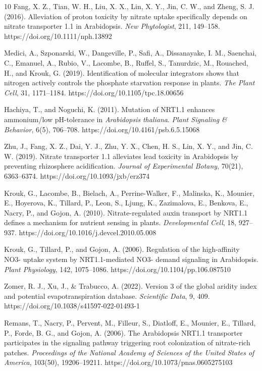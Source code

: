 \documentclass[unnumsec,webpdf,contemporary,large]{oup-authoring-template}%
\theoremstyle{thmstyleone}%
\theoremstyle{thmstyletwo}%
\theoremstyle{thmstylethree}%
\begin{document}
\begin{thebibliography}{10}
Fang, X. Z., Tian, W. H., Liu, X. X., Lin, X. Y., Jin, C. W., and Zheng, S. J. (2016).
Alleviation of proton toxicity by nitrate uptake specifically depends on nitrate transporter 1.1 in Arabidopsis.
\textit{New Phytologist}, 211, 149--158.
https://doi.org/10.1111/nph.13892

Medici, A., Szponarski, W., Dangeville, P., Safi, A., Dissanayake, I. M., Saenchai, C., Emanuel, A., Rubio, V., Lacombe, B., Ruffel, S., Tanurdzic, M., Rouached, H., and Krouk, G. (2019).
Identification of molecular integrators shows that nitrogen actively controls the phosphate starvation response in plants.
\textit{The Plant Cell}, 31, 1171--1184.
https://doi.org/10.1105/tpc.18.00656

Hachiya, T., and Noguchi, K. (2011).
Mutation of NRT1.1 enhances ammonium/low pH-tolerance in \textit{Arabidopsis thaliana}.
\textit{Plant Signaling \& Behavior}, 6(5), 706--708.
https://doi.org/10.4161/psb.6.5.15068

Zhu, J., Fang, X. Z., Dai, Y. J., Zhu, Y. X., Chen, H. S., Lin, X. Y., and Jin, C. W. (2019).
Nitrate transporter 1.1 alleviates lead toxicity in Arabidopsis by preventing rhizosphere acidification.
\textit{Journal of Experimental Botany}, 70(21), 6363--6374.
https://doi.org/10.1093/jxb/erz374

Krouk, G., Lacombe, B., Bielach, A., Perrine-Walker, F., Malinska, K., Mounier, E., Hoyerova, K., Tillard, P., Leon, S., Ljung, K., Zazimalova, E., Benkova, E., Nacry, P., and Gojon, A. (2010).
Nitrate-regulated auxin transport by NRT1.1 defines a mechanism for nutrient sensing in plants.
\textit{Developmental Cell}, 18, 927--937.
https://doi.org/10.1016/j.devcel.2010.05.008

Krouk, G., Tillard, P., and Gojon, A. (2006).
Regulation of the high-affinity NO3- uptake system by NRT1.1-mediated NO3- demand signaling in Arabidopsis.
\textit{Plant Physiology}, 142, 1075--1086.
https://doi.org/10.1104/pp.106.087510

Zomer, R. J., Xu, J., \& Trabucco, A. (2022).
Version 3 of the global aridity index and potential evapotranspiration database.
\textit{Scientific Data}, 9, 409.
https://doi.org/10.1038/s41597-022-01493-1


Remans, T., Nacry, P., Pervent, M., Filleur, S., Diatloff, E., Mounier, E., Tillard, P., Forde, B. G., and Gojon, A. (2006).
The Arabidopsis NRT1.1 transporter participates in the signaling pathway triggering root colonization of nitrate-rich patches.
\textit{Proceedings of the National Academy of Sciences of the United States of America}, 103(50), 19206--19211.
https://doi.org/10.1073/pnas.0605275103


\end{thebibliography}
\end{document}
